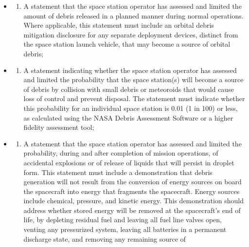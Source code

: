 \documentclass[
  letterpaper,
  DIV=11,
  numbers=noendperiod]{scrreport}
\providecommand{\tightlist}{%
  \setlength{\itemsep}{0pt}\setlength{\parskip}{0pt}}\usepackage{longtable,booktabs,array}
\begin{document}
\begin{itemize}
  \begin{itemize}
  \item
    \begin{enumerate}
    \def\labelenumi{(\roman{enumi})}
    \tightlist
    \item
      A statement that the space station operator has assessed and
      limited the amount of debris released in a planned manner during
      normal operations. Where applicable, this statement must include
      an orbital debris mitigation disclosure for any separate
      deployment devices, distinct from the space station launch
      vehicle, that may become a source of orbital debris;
    \end{enumerate}
  \item
    \begin{enumerate}
    \def\labelenumi{(\roman{enumi})}
    \setcounter{enumi}{1}
    \tightlist
    \item
      A statement indicating whether the space station operator has
      assessed and limited the probability that the space station(s)
      will become a source of debris by collision with small debris or
      meteoroids that would cause loss of control and prevent disposal.
      The statement must indicate whether this probability for an
      individual space station is 0.01 (1 in 100) or less, as calculated
      using the NASA Debris Assessment Software or a higher fidelity
      assessment tool;
    \end{enumerate}
  \item
    \begin{enumerate}
    \def\labelenumi{(\roman{enumi})}
    \setcounter{enumi}{2}
    \tightlist
    \item
      A statement that the space station operator has assessed and
      limited the probability, during and after completion of mission
      operations, of accidental explosions or of release of liquids that
      will persist in droplet form. This statement must include a
      demonstration that debris generation will not result from the
      conversion of energy sources on board the spacecraft into energy
      that fragments the spacecraft. Energy sources include chemical,
      pressure, and kinetic energy. This demonstration should address
      whether stored energy will be removed at the spacecraft's end of
      life, by depleting residual fuel and leaving all fuel line valves
      open, venting any pressurized system, leaving all batteries in a
      permanent discharge state, and removing any remaining source of

\end{enumerate}
\end{itemize}
\end{itemize}
\end{document}
